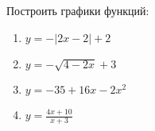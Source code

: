 \documentclass[a4paper]{article}
\title{}
\begin{document}
	\maketitle
\begin{hiProb}[1]
Построить графики функций:
\renewcommand{\labelenumi}{\asbuk{enumi})}
\begin{enumerate}
\item $y=-|2x-2|+2$
\item $y=-\sqrt{4-2x}+3 $
\item $y=-35 + 16 x - 2 x^2$
\item $\displaystyle y=\frac{4x+10}{x+3}$ 
\end{enumerate}
\end{hiProb}
\end{document}
